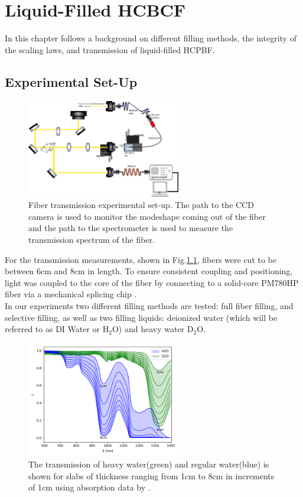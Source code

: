 \chapter{Liquid-Filled HCBCF}
In this chapter follows a background on different filling methods, the integrity of the scaling laws, and transmission of liquid-filled HCPBF.
\section{Experimental Set-Up}
\begin{figure}[!htb]
	\centering
	\includegraphics[width=0.6\textwidth]{./Figures/fiberfilling/Transmission_SetUp.png}
	\caption{Fiber transmission experimental set-up. The path to the CCD camera is used to monitor the modeshape coming out of the fiber and the path to the spectrometer is used to measure the transmission spectrum of the fiber.}
	\label{fig:filling exp}
\end{figure}
For the transmission measurements, shown in Fig.\ref{fig:filling exp}, fibers were cut to be between 6cm and 8cm in length. To ensure consistent coupling and positioning, light was coupled to the core of the fiber by connecting to a solid-core PM780HP fiber via a mechanical splicing chip \cite{maruf}.\\
In our experiments two different filling methods are tested: full fiber filling, and selective filling, as well as two filling liquids: deionized water (which will be referred to as DI Water or H${}_2$O) and heavy water D${}_2$O.
\begin{figure}[!htb]
	\centering
	\includegraphics[width=0.6\textwidth]{./Figures/fiberfilling/water_transmission/water_transmission.png}
	\caption{The transmission of heavy water(green) and regular water(blue) is shown for slabs of thickness ranging from 1cm to 8cm in increments of 1cm using absorption data by \cite{kedenburg}. }
	\label{fig:water transmission}
\end{figure}
